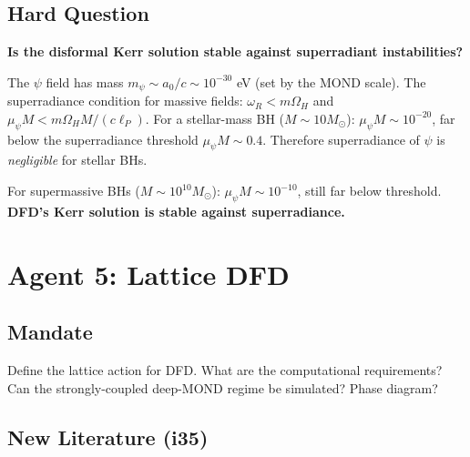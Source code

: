 \documentclass[11pt,a4paper]{article}
\begin{document}
\subsection{Hard Question}

\textbf{Is the disformal Kerr solution stable against superradiant instabilities?}

The $\psi$ field has mass $m_\psi \sim a_0/c \sim 10^{-30}$ eV (set by the MOND scale). The superradiance condition for massive fields: $\omega_R < m\Omega_H$ and $\mu_\psi M < m\Omega_H M/(c\ell_P)$. For a stellar-mass BH ($M \sim 10 M_\odot$): $\mu_\psi M \sim 10^{-20}$, far below the superradiance threshold $\mu_\psi M \sim 0.4$. Therefore superradiance of $\psi$ is \emph{negligible} for stellar BHs.

For supermassive BHs ($M \sim 10^{10} M_\odot$): $\mu_\psi M \sim 10^{-10}$, still far below threshold. \textbf{DFD's Kerr solution is stable against superradiance.}

\newpage
\section{Agent 5: Lattice DFD}
\label{sec:agent5}

\subsection{Mandate}

Define the lattice action for DFD. What are the computational requirements? Can the strongly-coupled deep-MOND regime be simulated? Phase diagram?

\subsection{New Literature (i35)}
\end{document}

